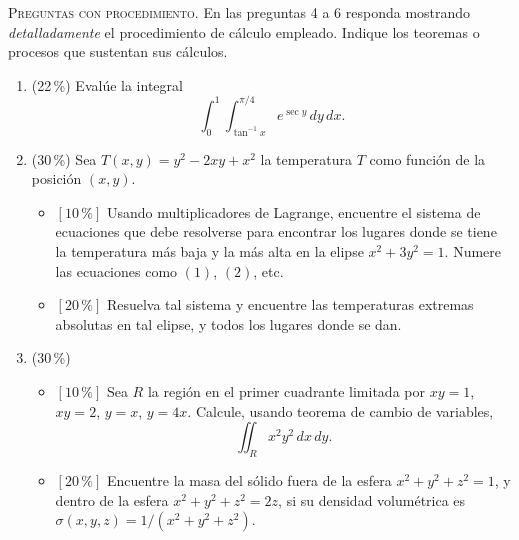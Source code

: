 \documentclass[11pt]{article}
\begin{document}
\vspace{4pt}
\noindent\textsc{Preguntas con procedimiento.} En las preguntas 4 a 6 responda mostrando \textit{detalladamente} el procedimiento de cálculo empleado. Indique los teoremas o procesos que sustentan sus cálculos.

\begin{enumerate}[start=4]
\item{} (22\,\%) Evalúe la integral
\[
\int_0^1 \int_{\tan^{-1} x}^{\pi/4} e^{\sec y}\,dy\,dx.
\]

\item{} (30\,\%) Sea $T(x,y) = y^2 - 2xy + x^2$ la temperatura $T$ como función de la posición $(x,y)$.
\begin{itemize}
\item[(i)] $[10\,\%]$ Usando multiplicadores de Lagrange, encuentre el sistema de ecuaciones que debe resolverse para encontrar los lugares donde se tiene la temperatura más baja y la más alta en la elipse $x^2 + 3y^2 = 1$. Numere las ecuaciones como $(1)$, $(2)$, etc.
\item[(ii)] $[20\,\%]$ Resuelva tal sistema y encuentre las temperaturas extremas absolutas en tal elipse, y todos los lugares donde se dan.
\end{itemize}

\item{} (30\,\%)
\begin{itemize}
\item[(i)] $[10\,\%]$ Sea $R$ la región en el primer cuadrante limitada por $xy = 1$, $xy = 2$, $y = x$, $y = 4x$. Calcule, usando teorema de cambio de variables,
\[
\iint_R x^2y^2\,dx\,dy.
\]
\item[(ii)] $[20\,\%]$ Encuentre la masa del sólido fuera de la esfera $x^2+y^2+z^2 = 1$, y dentro de la esfera $x^2+y^2+z^2 = 2z$, si su densidad volumétrica es $\sigma(x,y,z) = 1/(x^2+y^2+z^2)$.
\end{itemize}
\end{enumerate}

\examfooter
\end{document}
